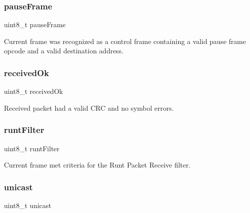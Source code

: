 \mbox{\label{struct_r_s_v___a1a7098c480755c10613115cc181aa126}} 
\subsubsection{\texorpdfstring{pauseFrame}{pauseFrame}}
{\footnotesize\ttfamily uint8\+\_\+t pause\+Frame}



Current frame was recognized as a control frame containing a valid pause frame opcode and a valid destination address. 

\mbox{\label{struct_r_s_v___a864bac3376c79921741bdde1db0d7570}} 
\subsubsection{\texorpdfstring{receivedOk}{receivedOk}}
{\footnotesize\ttfamily uint8\+\_\+t received\+Ok}



Received packet had a valid C\+RC and no symbol errors. 

\mbox{\label{struct_r_s_v___a27d64356a19179a097c7973f7d7a46a5}} 
\subsubsection{\texorpdfstring{runtFilter}{runtFilter}}
{\footnotesize\ttfamily uint8\+\_\+t runt\+Filter}



Current frame met criteria for the Runt Packet Receive filter. 

\mbox{\label{struct_r_s_v___ab2a20bde35ec4242bf38d69c8277114a}} 
\subsubsection{\texorpdfstring{unicast}{unicast}}
{\footnotesize\ttfamily uint8\+\_\+t unicast}



